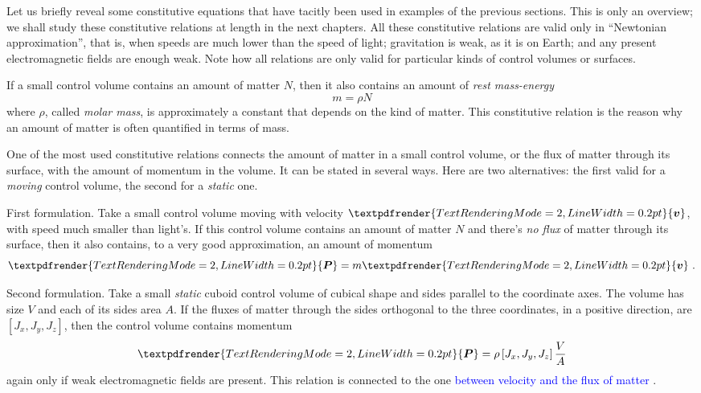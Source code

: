 \documentclass[a4paper,12pt,%
onecolumn,oneside,%
british%
]{memoir}
\renewcommand*{\bm}[1]{\textpdfrender{TextRenderingMode=2,LineWidth=0.2pt}{\boldsymbol{#1}}}
\renewcommand*{\|}[1][]{\nonscript\:#1\vert\nonscript\:\mathopen{}}
\newcommand*{\sect}{\S}%
\renewcommand*{\autoref}[3][\sect\,\ref]{\textcolor{blue}{#3}
\raisebox{0.6ex}{\color{blue}\miniscule%
\faIcon{angle-right}%
\;#1{#2}\;p.\,\pageref{#2}}}
\newcommand*{\masse}{mass-energy}
\newcommand*{\yv}{\bm{v}}
\newcommand*{\yN}{N}
\newcommand*{\yrho}{\rho}
\newcommand*{\ym}{m}%
\newcommand*{\yP}{\bm{P}}
\begin{document}
Let us briefly reveal some constitutive equations that have tacitly been used in examples of the previous sections. This is only an overview; we shall study these constitutive relations at length in the next chapters. All these constitutive relations are valid only in \enquote{Newtonian approximation}, that is, when speeds are much lower than the speed of light; gravitation is weak, as it is on Earth; and any present electromagnetic fields are enough weak. Note how all relations are only valid for particular kinds of control volumes or surfaces.

\begin{description}[itemsep=1em,wide]
\item[Constitutive relation for \masse\ and matter.]
If a small control volume contains an amount of matter $\yN$, then it also contains an amount of \emph{rest \masse}
\begin{equation*}
\ym =  \yrho\yN
\end{equation*}
where $\yrho$, called \emph{molar mass}, is approximately a constant that depends on the kind of matter. This constitutive relation is the reason why an amount of matter is often quantified in terms of mass.

\item[Constitutive relation for momentum and matter.]\label{item:momentum_mass_velocity} One of the most used constitutive relations connects the amount of matter in a small control volume, or the flux of matter through its surface, with the amount of momentum in the volume. It can be stated in several ways. Here are two alternatives: the first valid for a \emph{moving} control volume, the second for a \emph{static} one.


  First formulation. Take a small control volume moving with velocity $\yv$, with speed much smaller than light's. If this control volume contains an amount of matter $\yN$ and there's \emph{no flux} of matter through its surface, then it also contains, to a very good approximation, an amount of momentum
\begin{equation*}
  \yP = \ym\yv \ .%
\end{equation*}
%
%

\vspace{-\baselineskip}
Second formulation. Take a small \emph{static} cuboid control volume of cubical shape and sides parallel to the coordinate axes. The volume has size $V$ and each of its sides area $A$. If the fluxes of matter through the sides orthogonal to the three coordinates, in a positive direction, are $[J_{x}, J_{y}, J_{z}]$, then the control volume contains momentum
\begin{equation*}
  \yP = \yrho\,[J_{x}, J_{y}, J_{z}]\,\frac{V}{A}
\end{equation*}
again only if weak electromagnetic fields are present. This relation is connected to the one \autoref{sec:fluxes_velocities}{between velocity and the flux of matter}.



\end{description}
\end{document}
